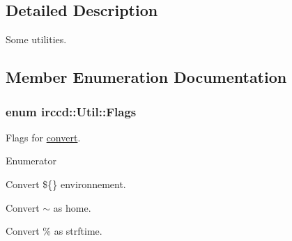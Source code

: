 \subsection{Detailed Description}
Some utilities. 

\subsection{Member Enumeration Documentation}
\hypertarget{a00069_a54c1cec58d78f37d2feb6c16aee294af}{
\subsubsection[{Flags}]{\setlength{\rightskip}{0pt plus 5cm}enum {\bf irccd\-::\-Util\-::\-Flags}}}\label{a00069_a54c1cec58d78f37d2feb6c16aee294af}


Flags for \hyperlink{a00069_a9214eb255c16d84fd26752530e2b5e94}{convert}. 

\begin{Desc}
\item[Enumerator]\par
\begin{description}
\item[{\em 
\hypertarget{a00069_a54c1cec58d78f37d2feb6c16aee294afa2ecfc7747124b2781d88a2d4b307d89d}{Convert\-Env}\label{a00069_a54c1cec58d78f37d2feb6c16aee294afa2ecfc7747124b2781d88a2d4b307d89d}
}]Convert \$\{\} environnement. \item[{\em 
\hypertarget{a00069_a54c1cec58d78f37d2feb6c16aee294afae8fcce2b65f6231c657ccf77ab972bc2}{Convert\-Home}\label{a00069_a54c1cec58d78f37d2feb6c16aee294afae8fcce2b65f6231c657ccf77ab972bc2}
}]Convert $\sim$ as home. \item[{\em 
\hypertarget{a00069_a54c1cec58d78f37d2feb6c16aee294afa977282d3d9ae2887cc5063142a1f10b0}{Convert\-Date}\label{a00069_a54c1cec58d78f37d2feb6c16aee294afa977282d3d9ae2887cc5063142a1f10b0}
}]Convert \% as strftime. \end{description}
\end{Desc}


